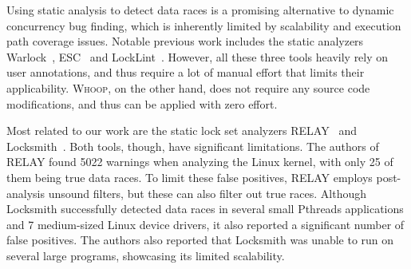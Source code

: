 Using static analysis to detect data races is a promising alternative to dynamic concurrency bug finding, which is inherently limited by scalability and execution path coverage issues. Notable previous work includes the static analyzers Warlock~\cite{sterling1993warlock}, ESC~\cite{detlefs1998extended} and LockLint~\cite{oracle2010locklint}. However, all these three tools heavily rely on user annotations, and thus require a lot of manual effort that limits their applicability. \textsc{Whoop}, on the other hand, does not require any source code modifications, and thus can be applied with zero effort.

Most related to our work are the static lock set analyzers RELAY~\cite{voung2007relay} and Locksmith~\cite{pratikakis2006locksmith}. Both tools, though, have significant limitations. The authors of RELAY found 5022 warnings when analyzing the Linux kernel, with only 25 of them being true data races. To limit these false positives, RELAY employs post-analysis unsound filters, but these can also filter out true races. Although Locksmith successfully detected data races in several small Pthreads applications and 7 medium-sized Linux device drivers, it also reported a significant number of false positives. The authors also reported that Locksmith was unable to run on several large programs, showcasing its limited scalability.